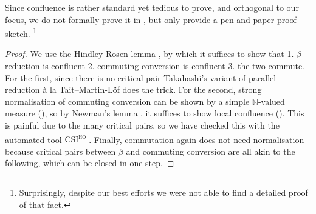 \documentclass[a4paper,UKenglish,cleveref, autoref, thm-restate]{lipics-v2021}
\begin{document}
Since confluence is rather standard \cite{girard1987proof} yet tedious to prove, and
orthogonal to our focus, we do not formally prove it in \Rocq,
but only provide a pen-and-paper proof sketch.%
\footnote{Surprisingly, despite our best efforts we were not able to find a
detailed proof of that fact.}


\begin{proof}
  We use the Hindley-Rosen lemma \cite[Prop. 3.3.5]{Barendregt1985}, by which
  it suffices to show that 1. \(\beta\)-reduction is confluent 2. commuting
  conversion is confluent 3. the two commute. For the first, since there is
  no critical pair Takahashi's variant of parallel reduction à la Tait--Martin-Löf
  \cite{Tait1967,Takahashi1995} does the trick. For the second, strong normalisation
  of commuting conversion can be shown by a simple \(\mathbb{N}\)-valued measure
  (),
  so by Newman's lemma \cite[3.1.42]{Barendregt1985}, it
  suffices to show local confluence ().
  This is painful due to the many critical
  pairs, so we have checked this with the automated tool \textsc{CSI\textsuperscript{ho}}
  \cite{Nagele2017}. Finally, commutation again does not need normalisation because
  critical pairs between \(\beta\) and commuting conversion
  are all akin to the following, which can be closed in one step.
\end{proof}
\end{document}
